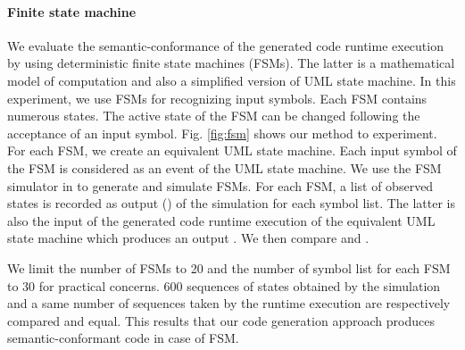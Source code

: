 \paragraph{Finite state machine}
We evaluate the semantic-conformance of the generated code runtime execution by using deterministic finite state machines (FSMs). The latter is a mathematical model of computation and also a simplified version of UML state machine. In this experiment, we use FSMs for recognizing input symbols. Each FSM contains numerous states. The active state of the FSM can be changed following the acceptance of an input symbol. Fig. \ref{fig:fsm} shows our method to experiment. For each FSM, we create an equivalent UML state machine. Each input symbol of the FSM is considered as an event of the UML state machine. We use the FSM simulator in \cite{fsmsim} to generate and simulate FSMs. For each FSM, a list of observed states is recorded as output () of the simulation for each symbol list. The latter is also the input of the generated code runtime execution of the equivalent UML state machine which produces an output . We then compare  and .

We limit the number of FSMs to 20 and the number of symbol list for each FSM to 30 for practical concerns. 600 sequences of states obtained by the simulation and a same number of sequences taken by the runtime execution are respectively compared and equal. This results that our code generation approach produces semantic-conformant code in case of FSM.

